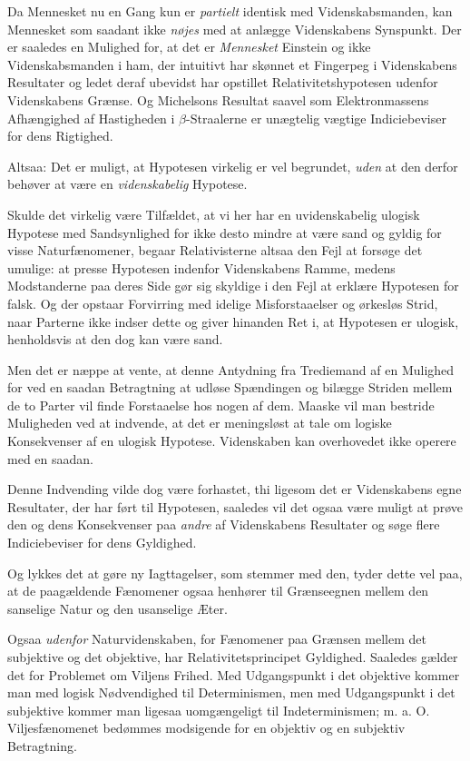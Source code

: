 \documentclass[12pt,a4paper]{article}
\newcommand{\opage}[1]{\marginnote{\footnotesize\textit{[#1]}}}
\begin{document}
Da Mennesket nu en Gang kun er \emph{partielt} identisk med
Videnskabsmanden, kan Mennesket som saadant ikke \emph{nøjes} med at
anlægge Videnskabens Synspunkt. Der er saaledes en Mulighed for, at det
er \emph{Mennesket} Einstein og ikke Videnskabsmanden i ham, der
intuitivt har skønnet et Fingerpeg i Videnskabens Resultater og ledet
deraf ubevidst har opstillet Relativitetshypotesen udenfor Videnskabens
Grænse. Og Michelsons Resultat saavel som Elektronmassens Afhængighed af
Hastigheden i $\beta$-Straalerne er unægtelig vægtige Indiciebeviser for
dens Rigtighed.

Altsaa: Det er muligt, at Hypotesen virkelig er vel begrundet,
\emph{uden} at den derfor behøver at være en \emph{videnskabelig}
Hypotese.

\bigskip

Skulde det virkelig være Tilfældet, at vi her har en uvidenskabelig
ulogisk Hypotese med Sandsynlighed for ikke desto mindre at være sand og
gyldig for visse Naturfænomener, begaar Relativisterne altsaa den Fejl at
forsøge det umulige: at presse Hypotesen indenfor Videnskabens Ramme,
medens Modstanderne paa deres Side gør sig skyldige i den Fejl at erklære
Hypotesen for falsk. Og der opstaar Forvirring med idelige
Misforstaaelser og ørkesløs Strid, naar Parterne ikke indser dette og
giver hinanden Ret i, at Hypotesen er ulogisk, henholdsvis at den dog kan
være sand.

\opage{17} Men det er næppe at vente, at denne Antydning fra Trediemand af en
Mulighed for ved en saadan Betragtning at udløse Spændingen og bilægge
Striden mellem de to Parter vil finde Forstaaelse hos nogen af dem.
Maaske vil man bestride Muligheden ved at indvende, at det er
meningsløst at tale om logiske Konsekvenser af en ulogisk Hypotese.
Videnskaben kan overhovedet ikke operere med en saadan.

Denne Indvending vilde dog være forhastet, thi ligesom det er
Videnskabens egne Resultater, der har ført til Hypotesen, saaledes vil
det ogsaa være muligt at prøve den og dens Konsekvenser paa \emph{andre}
af Videnskabens Resultater og søge flere Indiciebeviser for dens
Gyldighed.

Og lykkes det at gøre ny Iagttagelser, som stemmer med den, tyder dette
vel paa, at de paagældende Fænomener ogsaa henhører til Grænseegnen
mellem den sanselige Natur og den usanselige Æter.

\bigskip

Ogsaa \emph{udenfor} Naturvidenskaben, for Fænomener paa Grænsen mellem
det subjektive og det objektive, har Relativitetsprincipet Gyldighed.
Saaledes gælder det for Problemet om Viljens \guillemotleft
Frihed\guillemotright. Med Udgangspunkt i det objektive kommer man med
logisk Nødvendighed til Determinismen, men med Udgangspunkt i det
subjektive kommer man ligesaa uomgængeligt til Indeterminismen; m. a. O.
Viljesfænomenet bedømmes modsigende for en objektiv og en subjektiv
Betragtning.
\end{document}
